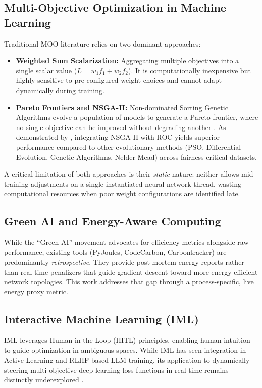 \documentclass[12pt,a4paper]{article}
\begin{document}
\subsection{Multi-Objective Optimization in Machine Learning}

Traditional MOO literature relies on two dominant approaches:

\begin{itemize}
    \item \textbf{Weighted Sum Scalarization:} Aggregating multiple objectives into a single scalar value ($L = w_1f_1 + w_2f_2$). It is computationally inexpensive but highly sensitive to pre-configured weight choices and cannot adapt dynamically during training.
    \item \textbf{Pareto Frontiers and NSGA-II:} Non-dominated Sorting Genetic Algorithms evolve a population of models to generate a Pareto frontier, where no single objective can be improved without degrading another \cite{deb2002nsga2}. As demonstrated by \cite{rN2024multiobj}, integrating NSGA-II with ROC yields superior performance compared to other evolutionary methods (PSO, Differential Evolution, Genetic Algorithms, Nelder-Mead) across fairness-critical datasets.
\end{itemize}

A critical limitation of both approaches is their \textit{static} nature: neither allows mid-training adjustments on a single instantiated neural network thread, wasting computational resources when poor weight configurations are identified late.

\subsection{Green AI and Energy-Aware Computing}

While the ``Green AI'' movement advocates for efficiency metrics alongside raw performance, existing tools (PyJoules, CodeCarbon, Carbontracker) are predominantly \textit{retrospective}. They provide post-mortem energy reports rather than real-time penalizers that guide gradient descent toward more energy-efficient network topologies. This work addresses that gap through a process-specific, live energy proxy metric.

\subsection{Interactive Machine Learning (IML)}

IML leverages Human-in-the-Loop (HITL) principles, enabling human intuition to guide optimization in ambiguous spaces. While IML has seen integration in Active Learning and RLHF-based LLM training, its application to dynamically steering multi-objective deep learning loss functions in real-time remains distinctly underexplored \cite{amershi2014power}.
\end{document}
